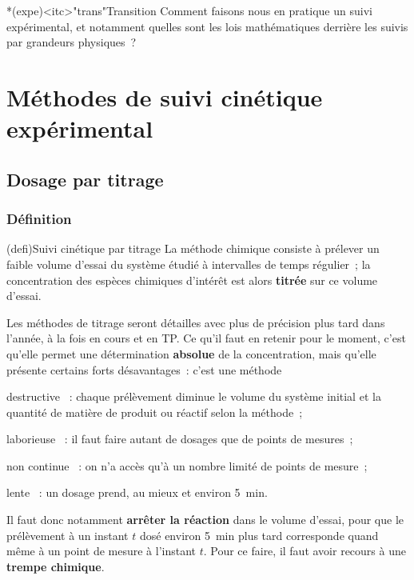 \documentclass[../../main/main.tex]{subfiles}
\begin{document}
\begin{tcb}*(expe)<itc>"trans"{Transition}
	Comment faisons nous en pratique un suivi expérimental, et notamment quelles
	sont les lois mathématiques derrière les suivis par grandeurs physiques~?
\end{tcb}

\section{Méthodes de suivi cinétique expérimental}
\subsection{Dosage par titrage}
\subsubsection{Définition}
\begin{tcb}[label=def:titrage](defi){Suivi cinétique par titrage}
	La méthode chimique consiste à prélever un faible volume d'essai du système
	étudié à intervalles de temps régulier~; la concentration des espèces
	chimiques d'intérêt est alors \textbf{titrée} sur ce volume d'essai.
\end{tcb}
Les méthodes de titrage seront détailles avec plus de précision plus tard dans
l'année, à la fois en cours et en TP. Ce qu'il faut en retenir pour le moment,
c'est qu'elle permet une détermination \textbf{absolue} de la concentration,
mais qu'elle présente certains forts désavantages~: c'est une méthode
\begin{bolditemize}
	\item[destructive]~: chaque prélèvement diminue le volume du système
	initial et la quantité de matière de produit ou réactif selon la
	méthode~;
	\item[laborieuse]~: il faut faire autant de dosages que de points de
	mesures~;
	\item[non continue]~: on n'a accès qu'à un nombre limité de points de
	mesure~;
	\item[lente]~: un dosage prend, au mieux et environ \SI{5}{min}.
\end{bolditemize}
Il faut donc notamment \textbf{arrêter la réaction} dans le volume d'essai, pour
que le prélèvement à un instant $t$ dosé environ \SI{5}{min} plus tard
corresponde quand même à un point de mesure à l'instant $t$. Pour ce faire, il
faut avoir recours à une \textbf{trempe chimique}.
\end{document}
